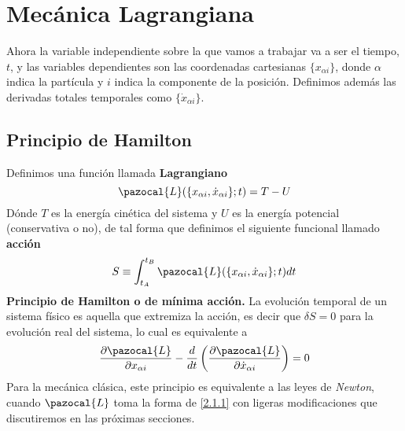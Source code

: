 \chapter{Mecánica Lagrangiana}
Ahora la variable independiente sobre la que vamos a trabajar va a ser el tiempo, $t$, y las variables dependientes son las coordenadas cartesianas $\{x_{\alpha i}\}$, donde $\alpha$ indica la partícula y $i$ indica la componente de la posición.
Definimos además las derivadas totales temporales como $\{\dot{x}_{\alpha i}\}$.
\section{Principio de Hamilton}

Definimos una función llamada \textbf{Lagrangiano}
\begin{equation} \label{2.1.1}
    \pazocal{L}(\{x_{\alpha i},\dot{x}_{\alpha i}\};t)=T-U
\end{equation} 
Dónde $T$ es la energía cinética del sistema y $U$ es la energía potencial (conservativa o no), de tal forma que definimos el siguiente funcional llamado \textbf{acción}
\begin{equation} \label{2.1.2}
    S \equiv \int_{t_A}^{t_B}{\pazocal{L}(\{x_{\alpha i},\dot{x}_{\alpha i}\};t)dt}
\end{equation} 
\textbf{Principio de Hamilton o de mínima acción.} La evolución temporal de un sistema físico es aquella que extremiza la acción, es decir que $\delta S = 0$ para la evolución real del sistema, lo cual es equivalente a
\begin{equation} \label{2.1.3}
    \frac{\partial \pazocal{L}}{\partial x_{\alpha i}} -\frac{d}{dt}\left(\frac{\partial \pazocal{L}}{\partial \dot{x}_{\alpha i}}\right) =0
\end{equation} 
Para la mecánica clásica, este principio es equivalente a las leyes de \textit{Newton}, cuando $\pazocal{L}$ toma la forma de \eqref{2.1.1} con ligeras modificaciones que discutiremos en las próximas secciones.
